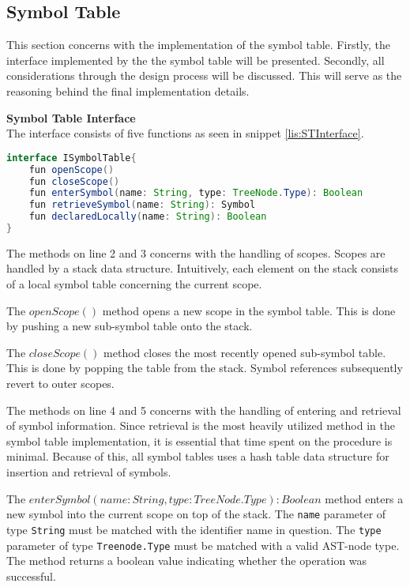 \subsection{Symbol Table}
This section concerns with the implementation of the symbol table. 
Firstly, the interface implemented by the the symbol table will be presented.
Secondly, all considerations through the design process will be discussed.
This will serve as the reasoning behind the final implementation details.

\textbf{Symbol Table Interface}\\
The interface consists of five functions as seen in snippet \ref{lis:STInterface}.

\begin{lstlisting}[language=java,label=lis:STInterface,caption=The interface which all symbol table implementations must implement.]
interface ISymbolTable{
	fun openScope()
	fun closeScope()
	fun enterSymbol(name: String, type: TreeNode.Type): Boolean
	fun retrieveSymbol(name: String): Symbol
	fun declaredLocally(name: String): Boolean
}
\end{lstlisting}

The methods on line 2 and 3 concerns with the handling of scopes.
Scopes are handled by a stack data structure.
Intuitively, each element on the stack consists of a local symbol table concerning the current scope.

The $openScope()$ method opens a new scope in the symbol table.
This is done by pushing a new sub-symbol table onto the stack.

The $closeScope()$ method closes the most recently opened sub-symbol table.
This is done by popping the table from the stack.
Symbol references subsequently revert to outer scopes.

The methods on line 4 and 5 concerns with the handling of entering and retrieval of symbol information.
Since retrieval is the most heavily utilized method in the symbol table implementation, it is essential that time spent on the procedure is minimal.
Because of this, all symbol tables uses a hash table data structure for insertion and retrieval of symbols. 

The $enterSymbol(name: String, type: TreeNode.Type): Boolean$ method enters a new symbol into the current scope on top of the stack.
The \texttt{name} parameter of type \texttt{String} must be matched with the identifier name in question.
The \texttt{type} parameter of type \texttt{Treenode.Type} must be matched with a valid AST-node type.
The method returns a boolean value indicating whether the operation was successful.

